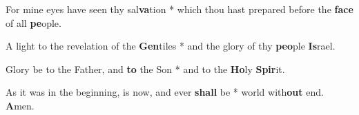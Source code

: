\begin{multicols}{2}
	For mine eyes have seen thy sal\textbf{va}tion * which thou hast prepared before the \textbf{face} of all \textbf{pe}ople.
	
%	
	
	A light to the revelation of the \textbf{Gen}tiles * and the glory of thy \textbf{peo}ple \textbf{Is}rael.
	
	Glory be to the Father, and \textbf{to} the Son * and to the \textbf{Ho}ly \textbf{Spir}it.
	
	As it was in the beginning, is now, and ever \textbf{shall} be * world with\textbf{out} end. \textbf{A}men.
\end{multicols}